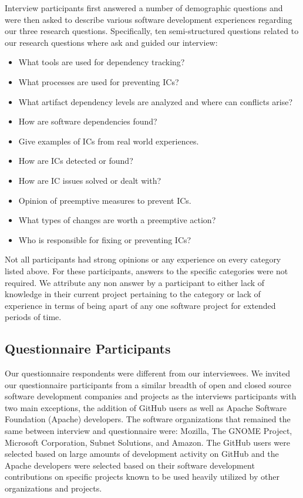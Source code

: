 \documentclass[conference]{IEEEtran}
\begin{document}

Interview participants first answered a number of demographic questions and were then asked to describe various software development experiences regarding our three research questions.
Specifically, ten semi-structured questions related to our research questions where ask and guided our interview:

\begin{itemize}
\item What tools are used for dependency tracking?
\item What processes are used for preventing ICs?
\item What artifact dependency levels are analyzed and where can conflicts arise?
\item How are software dependencies found?
\item Give examples of ICs from real world experiences.
\item How are ICs detected or found?
\item How are IC issues solved or dealt with?
\item Opinion of preemptive measures to prevent ICs.
\item What types of changes are worth a preemptive action?
\item Who is responsible for fixing or preventing ICs?
\end{itemize}

Not all participants had strong opinions or any experience on every category listed above. For these participants, answers
to the specific categories were not required. We attribute any non answer by a participant to
either lack of knowledge in their current project pertaining to the category or lack of experience in terms of
being apart of any one software project for extended periods of time.

\subsection{Questionnaire Participants}

Our questionnaire respondents were different from our interviewees. We invited our questionnaire participants from a similar
breadth of open and closed source software development
companies and projects as the interviews participants with two main exceptions, the addition of GitHub users as well as Apache Software Foundation (Apache) developers.
The software organizations that remained the same between interview and questionnaire were: Mozilla, The GNOME Project, Microsoft Corporation,
Subnet Solutions, and Amazon. The GitHub
users were selected based on large amounts of development activity on GitHub and the Apache developers
were selected based on their software development contributions on specific projects known to be used heavily
utilized by other organizations and projects.
\end{document}
